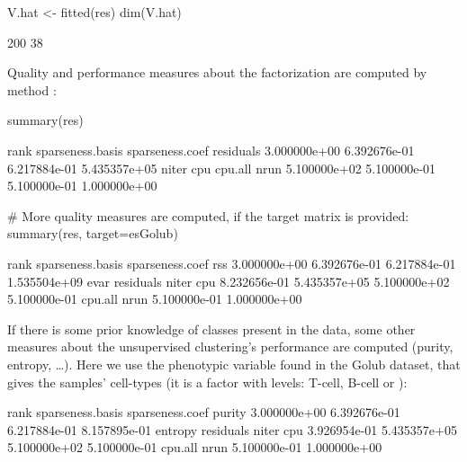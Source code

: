 \documentclass[a4paper]{article}
\begin{document}
\begin{Schunk}
\begin{Sinput}
 V.hat <- fitted(res)
 dim(V.hat)
\end{Sinput}
\begin{Soutput}
[1] 200  38
\end{Soutput}
\end{Schunk}

Quality and performance measures about the factorization are computed by 
method :

\begin{Schunk}
\begin{Sinput}
 summary(res)
\end{Sinput}
\begin{Soutput}
            rank sparseness.basis  sparseness.coef        residuals 
    3.000000e+00     6.392676e-01     6.217884e-01     5.435357e+05 
           niter              cpu          cpu.all             nrun 
    5.100000e+02     5.100000e-01     5.100000e-01     1.000000e+00 
\end{Soutput}
\begin{Sinput}
 # More quality measures are computed, if the target matrix is provided: 
 summary(res, target=esGolub)
\end{Sinput}
\begin{Soutput}
            rank sparseness.basis  sparseness.coef              rss 
    3.000000e+00     6.392676e-01     6.217884e-01     1.535504e+09 
            evar        residuals            niter              cpu 
    8.232656e-01     5.435357e+05     5.100000e+02     5.100000e-01 
         cpu.all             nrun 
    5.100000e-01     1.000000e+00 
\end{Soutput}
\end{Schunk}

If there is some prior knowledge of classes present in the data, 
some other measures about the unsupervised clustering's performance are computed 
(purity, entropy, \ldots). 
Here we use the phenotypic variable  found in the Golub dataset, 
that gives the samples' cell-types (it is a factor with levels: T-cell, 
B-cell or ):

\begin{Schunk}
\begin{Soutput}
            rank sparseness.basis  sparseness.coef           purity 
    3.000000e+00     6.392676e-01     6.217884e-01     8.157895e-01 
         entropy        residuals            niter              cpu 
    3.926954e-01     5.435357e+05     5.100000e+02     5.100000e-01 
         cpu.all             nrun 
    5.100000e-01     1.000000e+00 
\end{Soutput}
\end{Schunk}
\end{document}
